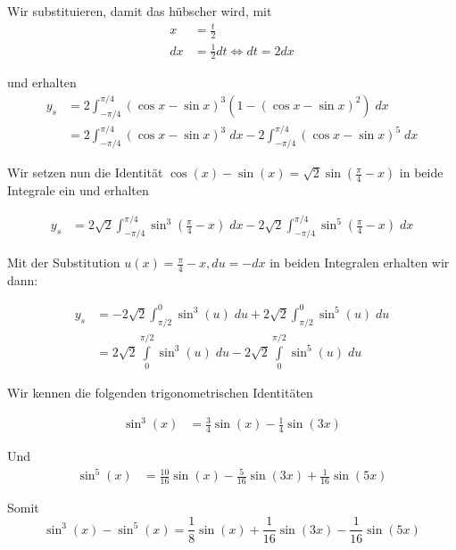 \documentclass[a4paper,german,12pt,smallheadings]{scrartcl}
\begin{document}
\begin{enumerate}[a)]
    Wir substituieren, damit das hübscher wird, mit
    \begin{align*}
      x &= \frac{t}{2} \\
      dx &= \frac{1}{2} dt \Leftrightarrow dt = 2dx
    \end{align*}

    und erhalten
    \begin{align*}
      y_s &= 2\int_{-\pi/4}^{\pi/4} \left(\cos x - \sin x\right)^3 \left(1-\left(\cos x - \sin x\right)^2\right) \; dx \\
          &= 2\int_{-\pi/4}^{\pi/4} \left(\cos x - \sin x\right)^3 \; dx - 2\int_{-\pi/4}^{\pi/4} \left(\cos x - \sin x\right)^5 \; dx
    \end{align*}

    Wir setzen nun die Identität $\cos(x) - \sin(x) = \sqrt{2}
    \sin\left(\frac{\pi}{4} - x\right)$ in beide Integrale ein und erhalten

    \begin{align*}
      y_s &= 2\sqrt{2}\int_{-\pi/4}^{\pi/4} \sin^3\left(\frac{\pi}{4} - x\right) \; dx 
           - 2\sqrt{2}\int_{-\pi/4}^{\pi/4} \sin^5\left(\frac{\pi}{4} - x\right) \; dx
    \end{align*}

    Mit der Substitution $u(x) = \frac{\pi}{4} - x, du = -dx$ in beiden
    Integralen erhalten wir dann:

    \begin{align*}
      y_s &= - 2\sqrt{2}\int_{\pi/2}^{0} \sin^3(u) \; du
             + 2\sqrt{2}\int_{\pi/2}^{0} \sin^5(u) \; du \\
             &= 2\sqrt{2}\int\limits_{0}^{\pi/2} \sin^3(u) \; du
             - 2\sqrt{2}\int\limits_{0}^{\pi/2} \sin^5(u) \; du
    \end{align*}

    Wir kennen die folgenden trigonometrischen Identitäten

    \begin{align*}
      \sin^3(x) &= \frac{3}{4}\sin(x) - \frac{1}{4} \sin(3x)
    \end{align*}

    Und
    \begin{align*}
      \sin^5(x) &= \frac{10}{16} \sin(x) - \frac{5}{16} \sin(3x) + \frac{1}{16}\sin(5x)
    \end{align*}

    Somit
    \begin{equation*}
      \sin^3(x) - \sin^5(x) = \frac{1}{8}\sin(x) + \frac{1}{16} \sin(3x) - \frac{1}{16}\sin(5x)
    \end{equation*}


\end{enumerate}
\end{document}
